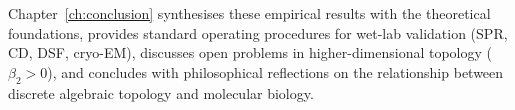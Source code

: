 Chapter~\ref{ch:conclusion} synthesises these empirical results with the
theoretical foundations, provides standard operating procedures for
wet-lab validation (SPR, CD, DSF, cryo-EM), discusses open problems
in higher-dimensional topology ($\beta_2 > 0$), and concludes with
philosophical reflections on the relationship between discrete algebraic
topology and molecular biology.
